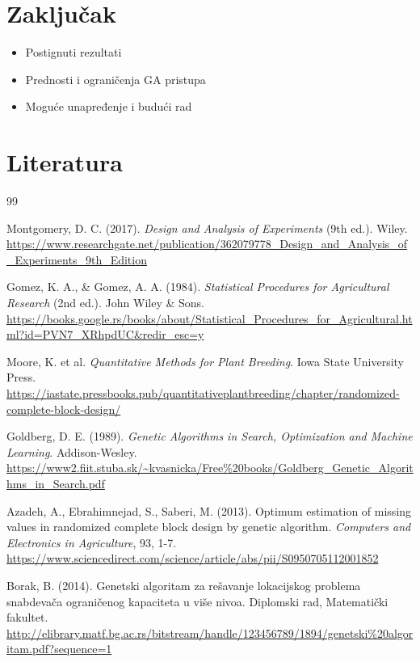 \documentclass[a4paper,12pt]{article}
\begin{document}
\section{Zaključak}
\begin{itemize}
\item Postignuti rezultati
\item Prednosti i ograničenja GA pristupa
\item Moguće unapređenje i budući rad
\end{itemize}


\section{Literatura}
\renewcommand{\refname}{}
\begin{thebibliography}{99}

 Montgomery, D. C. (2017). \textit{Design and Analysis of Experiments} (9th ed.). Wiley.  
\url{https://www.researchgate.net/publication/362079778_Design_and_Analysis_of_Experiments_9th_Edition}

 Gomez, K. A., \& Gomez, A. A. (1984). \textit{Statistical Procedures for Agricultural Research} (2nd ed.). John Wiley \& Sons.  
\url{https://books.google.rs/books/about/Statistical_Procedures_for_Agricultural.html?id=PVN7_XRhpdUC&redir_esc=y}

 Moore, K. et al. \textit{Quantitative Methods for Plant Breeding}. Iowa State University Press.  
\url{https://iastate.pressbooks.pub/quantitativeplantbreeding/chapter/randomized-complete-block-design/}

 Goldberg, D. E. (1989). \textit{Genetic Algorithms in Search, Optimization and Machine Learning}. Addison-Wesley.  
\url{https://www2.fiit.stuba.sk/~kvasnicka/Free%20books/Goldberg_Genetic_Algorithms_in_Search.pdf}

 Azadeh, A., Ebrahimnejad, S., Saberi, M. (2013). Optimum estimation of missing values in randomized complete block design by genetic algorithm. \textit{Computers and Electronics in Agriculture}, 93, 1-7. 
\url{https://www.sciencedirect.com/science/article/abs/pii/S0950705112001852}

 Borak, B. (2014). Genetski algoritam za rešavanje lokacijskog problema snabdevača ograničenog kapaciteta u više nivoa. Diplomski rad, Matematički fakultet.  
\url{http://elibrary.matf.bg.ac.rs/bitstream/handle/123456789/1894/genetski%20algoritam.pdf?sequence=1}

\end{thebibliography}
\end{document}
